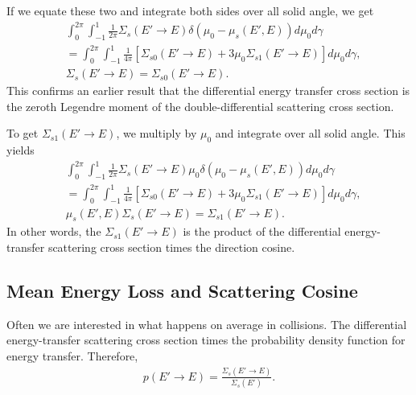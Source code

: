 If we equate these two and integrate both sides over all solid angle, we get
\begin{align}
   &\int_0^{2\pi} \int_{-1}^1 \frac{1}{2\pi} \Sigma_s(E' \rightarrow E ) \delta( \mu_0 - \mu_s(E',E) ) d\mu_0 d\gamma \nonumber \\
   &= \int_0^{2\pi} \int_{-1}^1  \frac{1}{4\pi} \left[ \Sigma_{s0}(E' \rightarrow E ) + 3 \mu_0 \Sigma_{s1}(E' \rightarrow E) \right] d\mu_0 d\gamma , \nonumber \\
   &\Sigma_s(E' \rightarrow E ) = \Sigma_{s0}(E' \rightarrow E ) .
\end{align}
This confirms an earlier result that the differential energy transfer cross section is the zeroth Legendre moment of the double-differential scattering cross section.

To get $\Sigma_{s1}(E' \rightarrow E)$, we multiply by $\mu_0$ and integrate over all solid angle. This yields
\begin{align}
   &\int_0^{2\pi} \int_{-1}^1 \frac{1}{2\pi} \Sigma_s(E' \rightarrow E ) \mu_0 \delta( \mu_0 - \mu_s(E',E) ) d\mu_0 d\gamma \nonumber \\
   &= \int_0^{2\pi} \int_{-1}^1  \frac{1}{4\pi} \left[ \Sigma_{s0}(E' \rightarrow E ) + 3 \mu_0 \Sigma_{s1}(E' \rightarrow E) \right] d\mu_0 d\gamma , \nonumber \\
   &\mu_s(E',E) \Sigma_s(E' \rightarrow E ) = \Sigma_{s1}(E' \rightarrow E ) .
\end{align}
In other words, the $\Sigma_{s1}(E' \rightarrow E)$ is the product of the differential energy-transfer scattering cross section times the direction cosine.

\subsection{Mean Energy Loss and Scattering Cosine}

Often we are interested in what happens on average in collisions. The differential energy-transfer scattering cross section times the probability density function for energy transfer. Therefore,
\begin{align}
  p( E' \rightarrow E ) = \frac{ \Sigma_s(E' \rightarrow E) }{ \Sigma_s(E') } .
\end{align}

